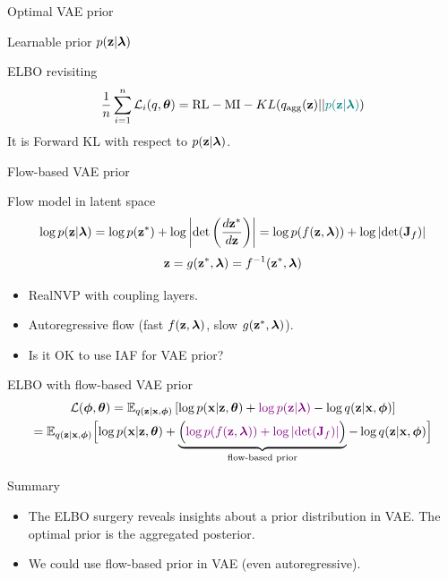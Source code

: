\begin{frame}{Optimal VAE prior}
\begin{minipage}[t]{0.5\columnwidth}
\begin{block}{Learnable prior $p(\mathbf{z} | \boldsymbol{\lambda})$}
\begin{figure}[h]
			\end{figure}
		\end{block}
	\end{minipage}
	\vspace{-0.4cm}
	\begin{block}{ELBO revisiting}
		\vspace{-0.3cm}
		\[
			\frac{1}{n}\sum_{i=1}^n \mathcal{L}_i(q, \boldsymbol{\theta}) = \text{RL} - \text{MI} -  KL(q_{\text{agg}}(\mathbf{z}) || {\color{teal}p(\mathbf{z} | \boldsymbol{\lambda})})
		\]
		It is Forward KL with respect to $p(\mathbf{z} | \boldsymbol{\lambda})$.
	\end{block}
\end{frame}
\begin{frame}{Flow-based VAE prior}
	\begin{block}{Flow model in latent space}
		\vspace{-0.5cm}
		\[
			\log p(\mathbf{z} | \boldsymbol{\lambda}) = \log p(\mathbf{z}^*) + \log  \left | \det \left(\frac{d \mathbf{z}^*}{d\mathbf{z}}\right)\right| = \log p(f(\mathbf{z}, \boldsymbol{\lambda})) + \log \left | \det (\mathbf{J}_f)\right| 
		\]
		\vspace{-0.3cm}
		\[
			\mathbf{z} = g(\mathbf{z}^*, \boldsymbol{\lambda}) = f^{-1}(\mathbf{z}^*, \boldsymbol{\lambda})
		\]
	\end{block}
	\vspace{-0.3cm}
	\begin{itemize}
		\item RealNVP with coupling layers.
		\item Autoregressive flow (fast $f(\mathbf{z}, \boldsymbol{\lambda})$, slow $g(\mathbf{z}^*, \boldsymbol{\lambda})$).
		\item {\color{gray}Is it OK to use IAF for VAE prior?}
	\end{itemize}
	\begin{block}{ELBO with flow-based VAE prior}
		\vspace{-0.5cm}
		{\small
		\begin{multline*}
			\mathcal{L}(\boldsymbol{\phi}, \boldsymbol{\theta}) = \mathbb{E}_{q(\mathbf{z} | \mathbf{x}, \boldsymbol{\phi})} \left[ \log p(\mathbf{x} | \mathbf{z}, \boldsymbol{\theta}) + {\color{violet}\log p(\mathbf{z} | \boldsymbol{\lambda})} - \log q(\mathbf{z} | \mathbf{x}, \boldsymbol{\phi}) \right] \\
				= \mathbb{E}_{q(\mathbf{z} | \mathbf{x}, \boldsymbol{\phi})} \Bigl[ \log p(\mathbf{x} | \mathbf{z}, \boldsymbol{\theta}) + \underbrace{ \Bigl({\color{violet} \log p(f(\mathbf{z}, \boldsymbol{\lambda})) + \log \left| \det (\mathbf{J}_f) \right|} \Bigr) }_{\text{flow-based prior}} - \log q(\mathbf{z} | \mathbf{x}, \boldsymbol{\phi}) \Bigr] 
		\end{multline*}
		}
	\end{block}
\end{frame}
\begin{frame}{Summary}
	\begin{itemize}
		\item The ELBO surgery reveals insights about a prior distribution in VAE. The optimal prior is the aggregated posterior.
		\vfill
		\item We could use flow-based prior in VAE (even autoregressive).
	\end{itemize}
\end{frame}

 
